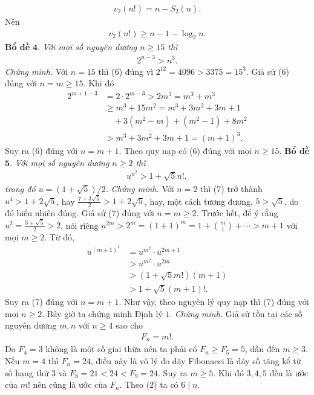 \begin{multicols}{2}
	\begin{align*}
		v_2(n!)=n-S_2(n).
	\end{align*}
	Nên 
	\begin{align*}
		v_2(n!)\geq n-1-\log_2 n.
	\end{align*}
	\textbf{\color{hoccungpi}Bổ đề} $\pmb{4.}$
	\textit{Với mọi số nguyên dương $n\geq 15$ thì}
		\begin{align*}
			2^{n-3}>n^3. \tag{$6$}
		\end{align*}
	\textit{Chứng minh.}
		Với $n=15$ thì ($6$) đúng vì $2^{12}=4096>3375=15^3$. Giả sử ($6$) đúng với $n=m\geq 15$. Khi đó 
		\begin{align*}
			2^{m+1-3} &=2\cdot 2^{m-3}>2m^3=m^3+m^3\\
			&\ge m^3+ 15m^2 = m^3 +\! 3m^2 \!+\! 3m +\! 1\\
			&\quad +3 (m^2-m)+ (m^2-1)+ 8m^2 \\
			&> m^3+3m^2+3m+1=(m+1)^3.
		\end{align*}
		Suy ra ($6$) đúng với $n=m+1$. Theo quy nạp có ($6$) đúng với mọi $n\geq 15$.
	\vskip 0.1cm
	\textbf{\color{hoccungpi}Bổ đề} $\pmb{5.}$
	\textit{Với mọi số nguyên dương $n\geq 2$ thì 
		\begin{align*}
			u^{n^2}>1+\sqrt{5}n!, \tag{$7$}
		\end{align*}
		trong đó $u=(1+\sqrt{5})/2$. }
	\vskip 0.1cm
	\textit{Chứng minh.} 
	Với $n=2$ thì ($7$) trở thành $u^4> 1+ 2\sqrt{5}$, hay $\frac{7+3\sqrt{5}}{2}> 1+ 2\sqrt{5}$, hay, một cách tương đương, $5> \sqrt{5}$, do đó hiển nhiên đúng. 
	\vskip 0.1cm	
	Giả sử ($7$) đúng với $n=m\geq 2$. Trước hết, để ý rằng $u^2 = \frac{3+ \sqrt{5}}{2}>2$, nói riêng $u^{2m}> 2^m= (1+1)^m = 1+ \binom{m}{1} + \cdots > m+1$ với mọi $m\ge 2$. Từ đó,
	\begin{align*}
			u^{(m+1)^2}&=u^{m^2}\cdot u^{2m+1}\\
			&> u^{m^2}\cdot u^{2m}\\
			&>(1+\sqrt{5}m!)(m+1)\\
			&>1+\sqrt{5}(m+1)!.
	\end{align*}
	Suy ra ($7$) đúng với $n=m+1$. Như vậy, theo nguyên lý quy nạp thì ($7$) đúng với mọi $n\geq 2$.
	\vskip 0.1cm
	Bây giờ ta chứng minh Định lý $1$.
	\vskip 0.1cm
	\textit{Chứng minh.}
	Giả sử tồn tại các số nguyên dương $m,n$ với $n\geq 4$ sao cho
	\begin{align*}
			F_n=m!. \tag{$8$}
	\end{align*}
	Do $F_4=3$ không là một số giai thừa nên ta phải có $F_n\geq F_5 =5$, dẫn đến $m\geq 3$. Nếu $m=4$ thì $F_n=24$, điều này là vô lý do dãy Fibonacci là dãy số tăng kể từ số hạng thứ 3 và $F_8=21< 24< F_9=24$. Suy ra $m\geq 5$. Khi đó $3,4,5$ đều là ước của $m!$ nên cũng là ước của $F_n$. Theo ($2$) ta có $6\mid n$. 

\end{multicols}
